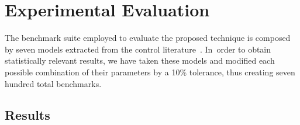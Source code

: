 \documentclass[a4paper,UKenglish]{lipics-v2018}
\newcommand{\note}[1]{\textcolor{red}{[#1]}}
\begin{document}
\section{Experimental Evaluation}
\label{exp:evaluation}

The benchmark suite employed to evaluate the proposed technique is composed
by seven models extracted from the control literature~\cite{acrobot, cstr,
CHEN1979389, KOKOTOVIC198023, gajic2008optimal, Franklin15, maglev,
converters}.  In~order to obtain statistically relevant results, we have
taken these models and modified each possible combination of their
parameters by a 10\% tolerance, thus creating seven hundred total benchmarks.



\subsection{Results}
\label{exp:results}
\end{document}
